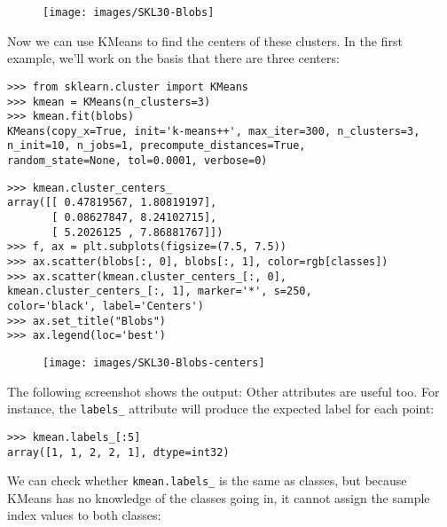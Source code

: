 \documentclass[SKL-MASTER.tex]{subfiles}
\begin{document}
\begin{figure}[h!]
\centering
\texttt{[image: images/SKL30-Blobs]}

\end{figure}

Now we can use KMeans to find the centers of these clusters. In the first example, we'll work on the basis that there are three centers:

\begin{framed}
\begin{verbatim}
>>> from sklearn.cluster import KMeans
>>> kmean = KMeans(n_clusters=3)
>>> kmean.fit(blobs)
KMeans(copy_x=True, init='k-means++', max_iter=300, n_clusters=3,
n_init=10, n_jobs=1, precompute_distances=True,
random_state=None, tol=0.0001, verbose=0)
\end{verbatim}
\end{framed}

\begin{framed}
\begin{verbatim}
>>> kmean.cluster_centers_
array([[ 0.47819567, 1.80819197],
       [ 0.08627847, 8.24102715],
       [ 5.2026125 , 7.86881767]])
>>> f, ax = plt.subplots(figsize=(7.5, 7.5))
>>> ax.scatter(blobs[:, 0], blobs[:, 1], color=rgb[classes])
>>> ax.scatter(kmean.cluster_centers_[:, 0],
kmean.cluster_centers_[:, 1], marker='*', s=250,
color='black', label='Centers')
>>> ax.set_title("Blobs")
>>> ax.legend(loc='best')
\end{verbatim}
\end{framed}
\begin{figure}
\centering
\texttt{[image: images/SKL30-Blobs-centers]}
\end{figure}

The following screenshot shows the output:
Other attributes are useful too. For instance, the \texttt{labels\_} attribute will produce the expected
label for each point:
\begin{framed}
	\begin{verbatim}
>>> kmean.labels_[:5]
array([1, 1, 2, 2, 1], dtype=int32)
\end{verbatim}
\end{framed}
We can check whether \texttt{kmean.labels\_} is the same as classes, but because KMeans has no
knowledge of the classes going in, it cannot assign the sample index values to both classes:
\end{document}
